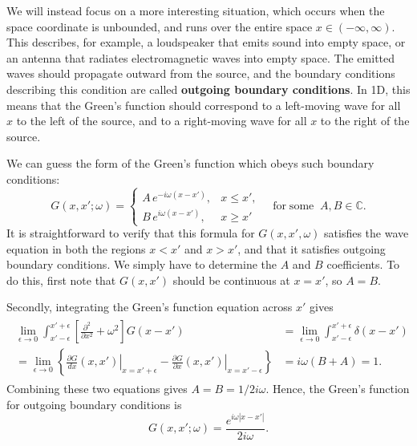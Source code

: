 \documentclass[10pt,a4paper]{article}
\begin{document}
We will instead focus on a more interesting situation, which occurs
when the space coordinate is unbounded, and runs over the entire space
$x \in (-\infty, \infty)$. This describes, for example, a loudspeaker
that emits sound into empty space, or an antenna that radiates
electromagnetic waves into empty space. The emitted waves should
propagate outward from the source, and the boundary conditions
describing this condition are called \textbf{outgoing boundary
  conditions}. In 1D, this means that the Green's function should
correspond to a left-moving wave for all $x$ to the left of the
source, and to a right-moving wave for all $x$ to the right of the
source.

We can guess the form of the Green's function which obeys such
boundary conditions:
\begin{equation}
  G(x,x';\omega) = \left\{\begin{array}{ll}A \, e^{-i\omega (x-x')}, & x \le x',
  \\ B \, e^{i\omega (x-x')}, & x \ge x'\end{array}\right.
  \quad \mathrm{for}\;\mathrm{some}\;\; A, B \in \mathbb{C}.
\end{equation}
It is straightforward to verify that this formula for $G(x,x',\omega)$
satisfies the wave equation in both the regions $x < x'$ and $x > x'$,
and that it satisfies outgoing boundary conditions. We simply have to
determine the $A$ and $B$ coefficients. To do this, first note that
$G(x,x')$ should be continuous at $x = x'$, so $A = B$.

Secondly, integrating the Green's function equation across $x'$ gives
\begin{align}
  \begin{aligned}
  \lim_{\epsilon \rightarrow 0} \int_{x'-\epsilon}^{x'+\epsilon}
  \left[\frac{\partial^2}{\partial x^2} + \omega^2\right]G(x-x')
  &= \lim_{\epsilon \rightarrow 0} \int_{x'-\epsilon}^{x'+\epsilon} \delta(x-x') \\
  = \lim_{\epsilon \rightarrow 0} \left\{ \left.\frac{\partial G}{dx} (x,x')
  \right|_{x = x'+\epsilon} - \left.\frac{\partial G}{\partial x} (x,x')
  \right|_{x = x'-\epsilon}\right\} &= i\omega (B + A) = 1.
  \end{aligned}
\end{align}
Combining these two equations gives $A = B = 1/2i\omega$. Hence, the
Green's function for outgoing boundary conditions is
\begin{equation}
G(x,x';\omega) = \frac{e^{i\omega |x-x'|}}{2i\omega}.
\end{equation}
\end{document}
